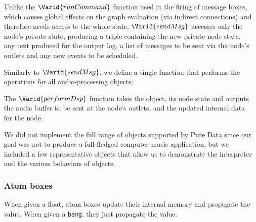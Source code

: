 Unlike the \ensuremath{\Varid{runCommand}} function used in the firing of message boxes,
which causes global effects on the graph evaluation (via indirect connections)
and therefore needs access to the whole state, \ensuremath{\Varid{sendMsg}} accesses
only the node's private state, producing a triple containing the new private
node state, any text produced for the output log, a list of messages to
be sent via the node's outlets and any new events to be scheduled.

Similarly to \ensuremath{\Varid{sendMsg}}, we define a single function that performs the
operations for all audio-processing objects:

\resethooks

The \ensuremath{\Varid{performDsp}} function takes the object, its node state and
outputs the audio buffer to be sent at the node's outlets, and the
updated internal data for the node.

We did not implement the full range of objects supported by Pure Data since
our goal was not to produce a full-fledged computer music application, but
we included a few representative objects that allow us to demonstrate the
interpreter and the various behaviors of objects.

\subsubsection{Atom boxes}

When given a float, atom boxes update their internal memory and propagate the
value. When given a \texttt{bang}, they just propagate the value.

